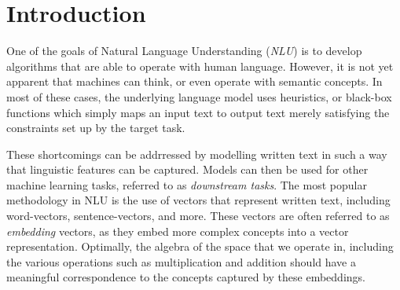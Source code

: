 \documentclass[a4paper,12pt,oneside,openright]{report}
\begin{document}
\pagestyle{fancy}

\fancyhf{}
\fancyhead[L]{\rightmark}
\fancyhead[R]{\thepage}
\renewcommand{\headrulewidth}{0pt}

\singlespacing

\onehalfspacing

\singlespacing


\setcounter{page}{0}
\pagestyle{plain}
\tableofcontents
\listoffigures
\listoftables

\onehalfspacing

\newcommand{\norm}[1]{\left\lVert#1\right\rVert}
\newcommand{\bracket}[1]{\left|#1\right|}
\newcommand{\absdet}[1]{\left|#1\right|}
\newcommand{\bftab}{\fontseries{b}\selectfont}

\newcolumntype{b}{X}


\chapter{Introduction}
\setcounter{page}{1} 

One of the goals of Natural Language Understanding (\textit{NLU}) is to develop algorithms that are able to operate with human language.
However, it is not yet apparent that machines can think, or even operate with semantic concepts.
In most of these cases, the underlying language model uses heuristics, or black-box functions which simply maps an input text to output text merely satisfying the constraints set up by the target task.

 
These shortcomings can be addrressed by modelling written text in such a way that linguistic features can be captured.
Models can then be used for other machine learning tasks, referred to as \textit{downstream tasks}.
The most popular methodology in NLU is the use of vectors that represent written text, including word-vectors, sentence-vectors, and more. 
These vectors are often referred to as \textit{embedding} vectors, as they embed more complex concepts into a vector representation.
Optimally, the algebra of the space that we operate in, including the various operations such as multiplication and addition should have a meaningful correspondence to the concepts captured by these embeddings.
\\
\end{document}
